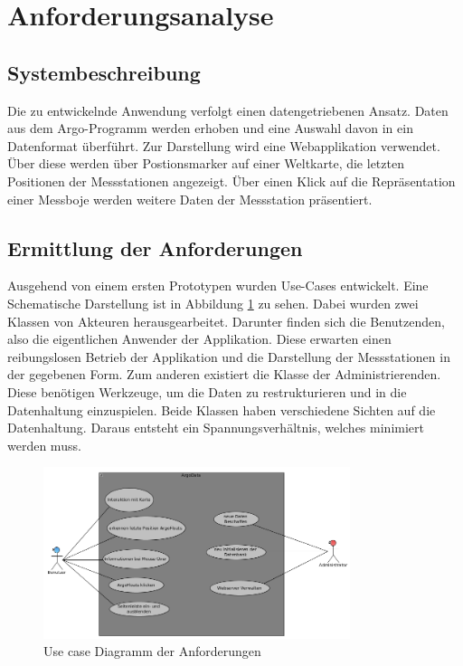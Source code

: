 \section{Anforderungsanalyse}

\subsection{Systembeschreibung}

    Die zu entwickelnde Anwendung verfolgt einen datengetriebenen Ansatz. Daten aus dem Argo-Programm werden erhoben und eine Auswahl davon in ein Datenformat überführt. Zur Darstellung wird eine Webapplikation verwendet. Über diese werden   über Postionsmarker auf einer Weltkarte, die letzten Positionen der Messstationen angezeigt.  Über einen Klick auf die Repräsentation einer Messboje werden weitere Daten der Messstation präsentiert.
    
    

    \subsection{Ermittlung der Anforderungen}
    
    Ausgehend von einem ersten Prototypen wurden Use-Cases entwickelt. Eine Schematische Darstellung ist in Abbildung  \ref{fig:use_case} zu sehen. Dabei wurden zwei Klassen von Akteuren herausgearbeitet. Darunter finden sich die Benutzenden, also die eigentlichen Anwender der Applikation. Diese erwarten einen reibungslosen Betrieb der Applikation und die Darstellung der Messstationen in der gegebenen Form. Zum anderen existiert die Klasse der Administrierenden. Diese benötigen Werkzeuge, um die Daten zu restrukturieren und in die Datenhaltung einzuspielen. Beide Klassen haben verschiedene Sichten auf die Datenhaltung. Daraus entsteht ein Spannungsverhältnis, welches minimiert werden muss.
    
    \begin{figure}[h!]
        \centering
        \includegraphics[width=0.8\textwidth]{pix/use-case.png}
        \caption{Use case Diagramm der Anforderungen}
        \label{fig:use_case}
    \end{figure}
    
